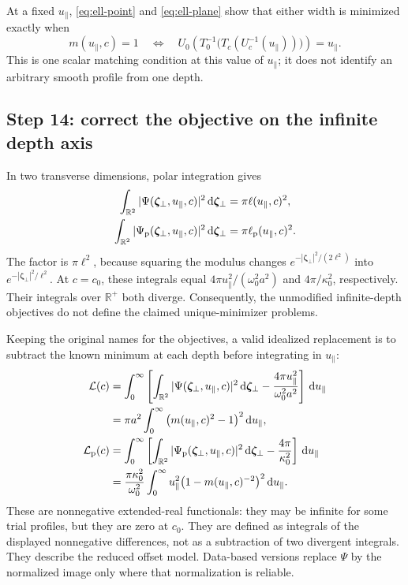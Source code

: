 \documentclass[11pt]{article}
\newcommand{\R}{\mathbb{R}}
\newcommand{\bzeta}{\boldsymbol{\zeta}}
\newcommand{\dd}{\,\mathrm{d}}
\begin{document}
At a fixed $u_\parallel$, \eqref{eq:ell-point} and
\eqref{eq:ell-plane} show that either width is minimized exactly when
\begin{equation}
m(u_\parallel,c)=1
\quad\Longleftrightarrow\quad
U_0\!\left(T_0^{-1}\big(T_c(U_c^{-1}(u_\parallel))\big)\right)
=u_\parallel.
\label{eq:minimum-condition}
\end{equation}
This is one scalar matching condition at this value of $u_\parallel$;
it does not identify an arbitrary smooth profile from one depth.

\subsection{Step 14: correct the objective on the infinite depth axis}

In two transverse dimensions, polar integration gives
\begin{align}
\int_{\R^2}|\Psi(\bzeta_\perp,u_\parallel,c)|^2\dd\bzeta_\perp
&=\pi\ell(u_\parallel,c)^2,\\
\int_{\R^2}|\Psi_{\rm p}(\bzeta_\perp,u_\parallel,c)|^2\dd\bzeta_\perp
&=\pi\ell_{\rm p}(u_\parallel,c)^2.
\end{align}
The factor is $\pi\ell^2$, because squaring the modulus changes
$e^{-|\bzeta_\perp|^2/(2\ell^2)}$ into
$e^{-|\bzeta_\perp|^2/\ell^2}$.
At $c=c_0$, these integrals equal
$4\pi u_\parallel^2/(\omega_0^2a^2)$ and $4\pi/\kappa_0^2$,
respectively. Their integrals over $\R^+$ both diverge.
Consequently, the unmodified infinite-depth objectives do not define
the claimed unique-minimizer problems.

Keeping the original names for the objectives, a valid idealized
replacement is to subtract the known minimum at each depth before
integrating in $u_\parallel$:
\begin{align}
\mathcal L(c)
&=\int_0^\infty\left[
\int_{\R^2}|\Psi(\bzeta_\perp,u_\parallel,c)|^2\dd\bzeta_\perp
-\frac{4\pi u_\parallel^2}{\omega_0^2a^2}\right]\dd u_\parallel
\nonumber\\
&=\pi a^2\int_0^\infty
\big(m(u_\parallel,c)^2-1\big)^2\dd u_\parallel,
\label{eq:renormalized-point}\\
\mathcal L_{\rm p}(c)
&=\int_0^\infty\left[
\int_{\R^2}|\Psi_{\rm p}(\bzeta_\perp,u_\parallel,c)|^2\dd\bzeta_\perp
-\frac{4\pi}{\kappa_0^2}\right]\dd u_\parallel
\nonumber\\
&=\frac{\pi\kappa_0^2}{\omega_0^2}
\int_0^\infty u_\parallel^2
\big(1-m(u_\parallel,c)^{-2}\big)^2\dd u_\parallel.
\label{eq:renormalized-plane}
\end{align}
These are nonnegative extended-real functionals: they may be infinite
for some trial profiles, but they are zero at $c_0$. They are defined
as integrals of the displayed nonnegative differences, not as a
subtraction of two divergent integrals. They describe the reduced
offset model. Data-based versions replace $\Psi$ by the normalized
image only where that normalization is reliable.
\end{document}
